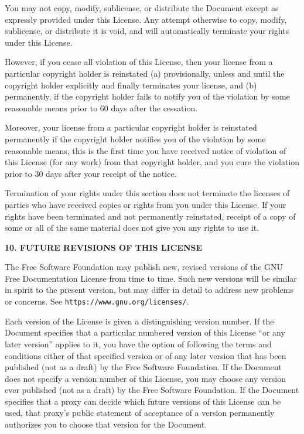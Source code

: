 \documentclass[]{report}
\theoremstyle{definition}
\theoremstyle{remark}
\theoremstyle{plain}
\numberwithin{equation}{chapter}
\begin{document}
\begin{multicols*}{2}
You may not copy, modify, sublicense, or distribute the Document
except as expressly provided under this License.  Any attempt
otherwise to copy, modify, sublicense, or distribute it is void, and
will automatically terminate your rights under this License.

However, if you cease all violation of this License, then your license
from a particular copyright holder is reinstated (a) provisionally,
unless and until the copyright holder explicitly and finally
terminates your license, and (b) permanently, if the copyright holder
fails to notify you of the violation by some reasonable means prior to
60 days after the cessation.

Moreover, your license from a particular copyright holder is
reinstated permanently if the copyright holder notifies you of the
violation by some reasonable means, this is the first time you have
received notice of violation of this License (for any work) from that
copyright holder, and you cure the violation prior to 30 days after
your receipt of the notice.

Termination of your rights under this section does not terminate the
licenses of parties who have received copies or rights from you under
this License.  If your rights have been terminated and not permanently
reinstated, receipt of a copy of some or all of the same material does
not give you any rights to use it.


\begin{center}
	{\footnotesize\bf 10. FUTURE REVISIONS OF THIS LICENSE\par}
\end{center}


The Free Software Foundation may publish new, revised versions
of the GNU Free Documentation License from time to time.  Such new
versions will be similar in spirit to the present version, but may
differ in detail to address new problems or concerns.  See
\texttt{https://www.gnu.org/licenses/}.

Each version of the License is given a distinguishing version number.
If the Document specifies that a particular numbered version of this
License ``or any later version'' applies to it, you have the option of
following the terms and conditions either of that specified version or
of any later version that has been published (not as a draft) by the
Free Software Foundation.  If the Document does not specify a version
number of this License, you may choose any version ever published (not
as a draft) by the Free Software Foundation.  If the Document
specifies that a proxy can decide which future versions of this
License can be used, that proxy's public statement of acceptance of a
version permanently authorizes you to choose that version for the
Document.



\end{multicols*}
\end{document}
